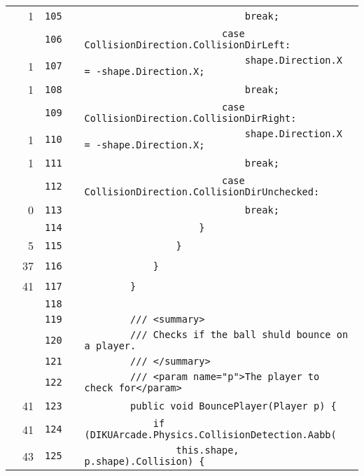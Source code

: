 \documentclass[a4paper,landscape,10pt]{article}
\begin{document}
\begin{longtable}[l]{lrrll}
\cellcolor{green} & 1 & \verb~105~ & & \verb~                            break;~\\
\cellcolor{gray} &  & \verb~106~ & & \verb~                        case CollisionDirection.CollisionDirLeft:~\\
\cellcolor{green} & 1 & \verb~107~ & & \verb~                            shape.Direction.X = -shape.Direction.X;~\\
\cellcolor{green} & 1 & \verb~108~ & & \verb~                            break;~\\
\cellcolor{gray} &  & \verb~109~ & & \verb~                        case CollisionDirection.CollisionDirRight:~\\
\cellcolor{green} & 1 & \verb~110~ & & \verb~                            shape.Direction.X = -shape.Direction.X;~\\
\cellcolor{green} & 1 & \verb~111~ & & \verb~                            break;~\\
\cellcolor{gray} &  & \verb~112~ & & \verb~                        case CollisionDirection.CollisionDirUnchecked:~\\
\cellcolor{red} & 0 & \verb~113~ & & \verb~                            break;~\\
\cellcolor{gray} &  & \verb~114~ & & \verb~                    }~\\
\cellcolor{green} & 5 & \verb~115~ & & \verb~                }~\\
\cellcolor{green} & 37 & \verb~116~ & & \verb~            }~\\
\cellcolor{green} & 41 & \verb~117~ & & \verb~        }~\\
\cellcolor{gray} &  & \verb~118~ & & \verb~~\\
\cellcolor{gray} &  & \verb~119~ & & \verb~        /// <summary>~\\
\cellcolor{gray} &  & \verb~120~ & & \verb~        /// Checks if the ball shuld bounce on a player.~\\
\cellcolor{gray} &  & \verb~121~ & & \verb~        /// </summary>~\\
\cellcolor{gray} &  & \verb~122~ & & \verb~        /// <param name="p">The player to check for</param>~\\
\cellcolor{green} & 41 & \verb~123~ & & \verb~        public void BouncePlayer(Player p) {~\\
\cellcolor{green} & 41 & \verb~124~ & & \verb~            if (DIKUArcade.Physics.CollisionDetection.Aabb(~\\
\cellcolor{green} & 43 & \verb~125~ & & \verb~                this.shape, p.shape).Collision) {~\\

\end{longtable}
\end{document}
